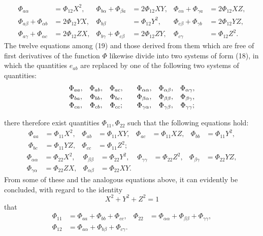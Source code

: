 \documentclass[11pt,a4paper,leqno]{article}
\begin{document}
\[
\begin{aligned}
\Phi_{a\alpha}&=\Phi_{12}X^2,
&\Phi_{b\alpha}+\Phi_{\beta a}&=2\Phi_{12}XY,
&\Phi_{c\alpha}+\Phi_{\gamma a}&=2\Phi_{12}XZ,\\
\Phi_{a\beta}+\Phi_{\alpha b}&=2\Phi_{12}YX,
&\Phi_{b\beta}&=\Phi_{12}Y^2,
&\Phi_{c\beta}+\Phi_{\gamma b}&=2\Phi_{12}YZ,\\
\Phi_{a\gamma}+\Phi_{\alpha c}&=2\Phi_{12}ZX,
&\Phi_{b\gamma}+\Phi_{c\beta}&=2\Phi_{12}ZY,
&\Phi_{c\gamma}&=\Phi_{12}Z^2.
\end{aligned}
\]
The twelve equations among (19) and those derived from them which are
free of first derivatives of the function $\Phi$ likewise divide into two
systems of form (18), in which the quantities $e_{ab}$ are replaced by
one of the following two systems of quantities:
\[
\begin{array}{ccc@{\qquad}ccc}
\Phi_{aa},&\Phi_{ab},&\Phi_{ac},&
\Phi_{\alpha\alpha},&\Phi_{\alpha\beta},&\Phi_{\alpha\gamma},\\
\Phi_{ba},&\Phi_{bb},&\Phi_{bc},&
\Phi_{\beta\alpha},&\Phi_{\beta\beta},&\Phi_{\beta\gamma},\\
\Phi_{ca},&\Phi_{cb},&\Phi_{cc};&
\Phi_{\gamma\alpha},&\Phi_{\gamma\beta},&\Phi_{\gamma\gamma};
\end{array}
\]

there therefore exist quantities $\Phi_{11},\Phi_{22}$ such that the following
equations hold:
\[
\begin{aligned}
\Phi_{aa}&=\Phi_{11}X^2,&\Phi_{ab}&=\Phi_{11}XY,&
\Phi_{ac}&=\Phi_{11}XZ,&\Phi_{bb}&=\Phi_{11}Y^2,\\
\Phi_{bc}&=\Phi_{11}YZ,&\Phi_{cc}&=\Phi_{11}Z^2;
\end{aligned}
\]
\[
\begin{aligned}
\Phi_{\alpha\alpha}&=\Phi_{22}X^2,&\Phi_{\beta\beta}&=\Phi_{22}Y^2,&
\Phi_{\gamma\gamma}&=\Phi_{22}Z^2,&\Phi_{\beta\gamma}&=\Phi_{22}YZ,\\
\Phi_{\gamma\alpha}&=\Phi_{22}ZX,&\Phi_{\alpha\beta}&=\Phi_{22}XY.
\end{aligned}
\]
From some of these and the analogous equations above, it can evidently
be concluded, with regard to the identity
\[
X^2+Y^2+Z^2=1
\]
that
\begin{equation}\tag{20}
\begin{aligned}
\Phi_{11}&=\Phi_{aa}+\Phi_{bb}+\Phi_{cc},
&\Phi_{22}&=\Phi_{\alpha\alpha}+\Phi_{\beta\beta}+\Phi_{\gamma\gamma},\\
\Phi_{12}&=\Phi_{a\alpha}+\Phi_{b\beta}+\Phi_{c\gamma}.
\end{aligned}
\end{equation}
\end{document}
